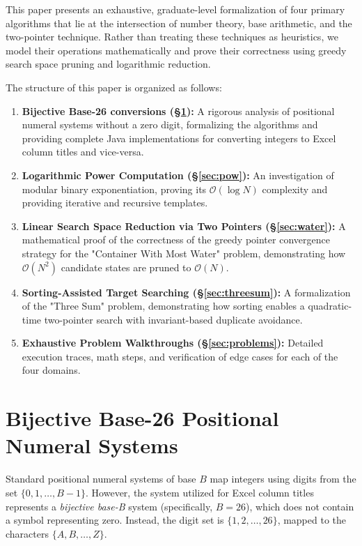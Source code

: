 \documentclass[10pt,journal,compsoc,onecolumn]{IEEEtran}
\begin{document}
This paper presents an exhaustive, graduate-level formalization of four primary algorithms that lie at the intersection of number theory, base arithmetic, and the two-pointer technique. Rather than treating these techniques as heuristics, we model their operations mathematically and prove their correctness using greedy search space pruning and logarithmic reduction.

The structure of this paper is organized as follows:
\begin{enumerate}
    \item \textbf{Bijective Base-26 conversions (\S\ref{sec:base26}):} A rigorous analysis of positional numeral systems without a zero digit, formalizing the algorithms and providing complete Java implementations for converting integers to Excel column titles and vice-versa.
    \item \textbf{Logarithmic Power Computation (\S\ref{sec:pow}):} An investigation of modular binary exponentiation, proving its $\mathcal{O}(\log N)$ complexity and providing iterative and recursive templates.
    \item \textbf{Linear Search Space Reduction via Two Pointers (\S\ref{sec:water}):} A mathematical proof of the correctness of the greedy pointer convergence strategy for the "Container With Most Water" problem, demonstrating how $\mathcal{O}(N^2)$ candidate states are pruned to $\mathcal{O}(N)$.
    \item \textbf{Sorting-Assisted Target Searching (\S\ref{sec:threesum}):} A formalization of the "Three Sum" problem, demonstrating how sorting enables a quadratic-time two-pointer search with invariant-based duplicate avoidance.
    \item \textbf{Exhaustive Problem Walkthroughs (\S\ref{sec:problems}):} Detailed execution traces, math steps, and verification of edge cases for each of the four domains.
\end{enumerate}

\section{Bijective Base-26 Positional Numeral Systems}
\label{sec:base26}

Standard positional numeral systems of base $B$ map integers using digits from the set $\{0, 1, \ldots, B-1\}$. However, the system utilized for Excel column titles represents a \emph{bijective base-B} system (specifically, $B=26$), which does not contain a symbol representing zero. Instead, the digit set is $\{1, 2, \ldots, 26\}$, mapped to the characters $\{A, B, \ldots, Z\}$.
\end{document}
